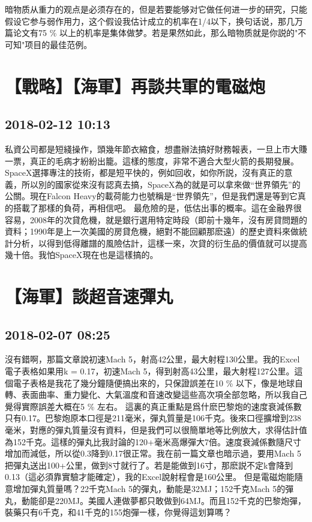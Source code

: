 \documentclass[twocolumn]{ctexart}
\begin{document}
暗物质从重力的观点是必须存在的，但是若要能够对它做任何进一步的研究，只能假设它参与弱作用力，这个假设我估计成立的机率在1/4以下，换句话说，那几万篇论文有75 \% 以上的机率是集体做梦。若是果然如此，那么暗物质就是你説的"不可知"项目的最佳范例。\section*{【戰略】【海軍】再談共軍的電磁炮}
\subsection*{2018-02-12 10:13}

私資公司都是短綫操作，頭幾年節衣縮食，想盡辦法搞好財務報表，一旦上市大賺一票，真正的毛病才紛紛出籠。這樣的態度，非常不適合大型火箭的長期發展。
SpaceX選擇專注的技術，都是短平快的，例如回收，如你所説，沒有真正的意義，所以別的國家從來沒有認真去搞，SpaceX為的就是可以拿來做“世界領先”的公關。現在Falcon Heavy的載荷能力也號稱是“世界領先”，但是我們還是等到它真的搭載了那樣的負荷，再相信吧。
最危險的是，低估出事的概率。這在金融界很容易，2008年的次貸危機，就是銀行選用特定時段（即前十幾年，沒有房貸問題的資料；1990年是上一次美國的房貸危機，絕對不能回顧那麽遠）的歷史資料來做統計分析，以得到低得離譜的風險估計，這樣一來，次貸的衍生品的價值就可以提高幾十倍。我怕SpaceX現在也是這樣搞的。
\section*{【海軍】談超音速彈丸}
\subsection*{2018-02-07 08:25}

沒有錯啊，那篇文章說初速Mach 5，射高42公里，最大射程130公里。我的Excel電子表格如果用k = 0.17，初速Mach 5，得到射高43公里，最大射程127公里。這個電子表格是我花了幾分鐘隨便搞出來的，只保證誤差在10 \% 以下，像是地球自轉、表面曲率、重力變化、大氣溫度和音速改變這些高次項全部忽略，所以我自己覺得實際誤差大概在5 \% 左右。
這裏的真正重點是爲什麽巴黎炮的速度衰減係數只有0.17。巴黎炮原本口徑是211毫米，彈丸質量是106千克。後來口徑擴增到238毫米，對應的彈丸質量沒有資料，但是我們可以很簡單地等比例放大，求得估計值為152千克。這樣的彈丸比我討論的120+毫米高爆彈大7倍。速度衰減係數隨尺寸增加而減低，所以從0.3降到0.17很正常。我在前一篇文章也暗示過，要用Mach 5把彈丸送出100+公里，做到8寸就行了。若是能做到16寸，那麽説不定k會降到0.13（這必須靠實驗才能確定），我的Excel說射程會是160公里。
但是電磁炮能隨意增加彈丸質量嗎？22千克Mach 5的彈丸，動能是32MJ；152千克Mach 5的彈丸，動能卻是220MJ。美國人連做夢都只敢做到64MJ。而且152千克的巴黎炮彈，裝藥只有6千克，和41千克的155炮彈一樣，你覺得這划算嗎？
\end{document}
